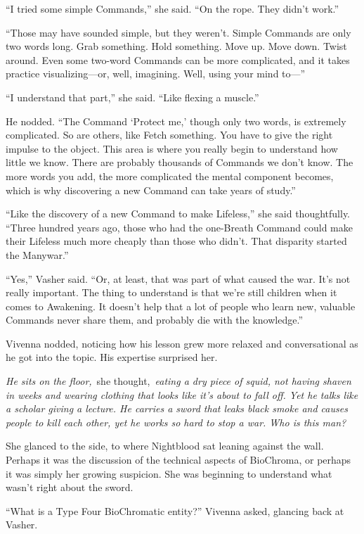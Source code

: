 “I tried some simple Commands,” she said. “On the rope. They didn’t work.”

“Those may have sounded simple, but they weren’t. Simple Commands are only two words long. Grab something. Hold something. Move up. Move down. Twist around. Even some two-word Commands can be more complicated, and it takes practice visualizing—or, well, imagining. Well, using your mind to—”

“I understand that part,” she said. “Like flexing a muscle.”

He nodded. “The Command ‘Protect me,’ though only two words, is extremely complicated. So are others, like Fetch something. You have to give the right impulse to the object. This area is where you really begin to understand how little we know. There are probably thousands of Commands we don’t know. The more words you add, the more complicated the mental component becomes, which is why discovering a new Command can take years of study.”

“Like the discovery of a new Command to make Lifeless,” she said thoughtfully. “Three hundred years ago, those who had the one-Breath Command could make their Lifeless much more cheaply than those who didn’t. That disparity started the Manywar.”

“Yes,” Vasher said. “Or, at least, that was part of what caused the war. It’s not really important. The thing to understand is that we’re still children when it comes to Awakening. It doesn’t help that a lot of people who learn new, valuable Commands never share them, and probably die with the knowledge.”

Vivenna nodded, noticing how his lesson grew more relaxed and conversational as he got into the topic. His expertise surprised her.

\textit{He sits on the floor,}~she thought,~\textit{eating a dry piece of squid, not having shaven in weeks and wearing clothing that looks like it’s about to fall off. Yet he talks like a scholar giving a lecture. He carries a sword that leaks black smoke and causes people to kill each other, yet he works so hard to stop a war. Who is this man?}

She glanced to the side, to where Nightblood sat leaning against the wall. Perhaps it was the discussion of the technical aspects of BioChroma, or perhaps it was simply her growing suspicion. She was beginning to understand what wasn’t right about the sword.

“What is a Type Four BioChromatic entity?” Vivenna asked, glancing back at Vasher.

